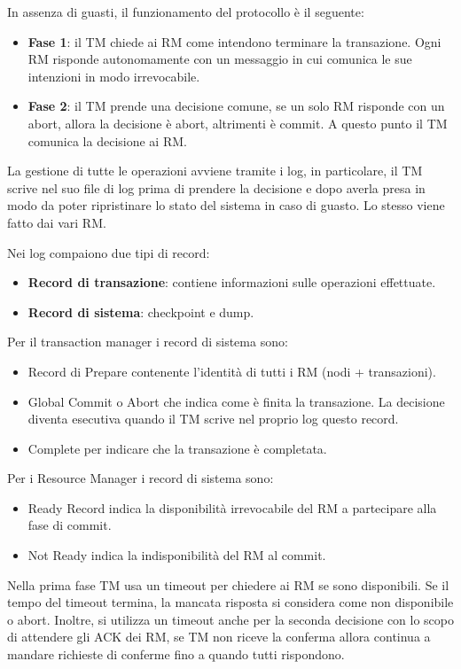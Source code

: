 In assenza di guasti, il funzionamento del protocollo è il seguente:
\begin{itemize}
      \item \textbf{Fase 1}: il TM chiede ai RM come intendono terminare la
            transazione. Ogni RM risponde autonomamente con un messaggio in cui
            comunica le sue intenzioni in modo irrevocabile.
      \item \textbf{Fase 2}: il TM prende una decisione comune, se un solo RM
            risponde con un abort, allora la decisione è abort, altrimenti è
            commit. A questo punto il TM comunica la decisione ai RM.
\end{itemize}
La gestione di tutte le operazioni avviene tramite i log, in particolare, il TM
scrive nel suo file di log prima di prendere la decisione e dopo averla presa
in modo da poter ripristinare lo stato del sistema in caso di guasto. Lo stesso
viene fatto dai vari RM.

Nei log compaiono due tipi di record:
\begin{itemize}
      \item \textbf{Record di transazione}: contiene informazioni sulle operazioni
            effettuate.
      \item \textbf{Record di sistema}: checkpoint e dump.
\end{itemize}

Per il transaction manager i record di sistema sono:
\begin{itemize}
      \item Record di Prepare contenente l'identità di tutti i RM (nodi + transazioni).
      \item Global Commit o Abort che indica come è finita la transazione. La
            decisione diventa esecutiva quando il TM scrive nel proprio log
            questo record.
      \item Complete per indicare che la transazione è completata.
\end{itemize}
Per i Resource Manager i record di sistema sono:
\begin{itemize}
      \item Ready Record indica la disponibilità irrevocabile del RM a partecipare
            alla fase di commit.
      \item Not Ready indica la indisponibilità del RM al commit.
\end{itemize}

Nella prima fase TM usa un timeout per chiedere ai RM se sono disponibili. Se il
tempo del timeout termina, la mancata risposta si considera come non disponibile
o abort. Inoltre, si utilizza un timeout anche per la seconda decisione con lo
scopo di attendere gli ACK dei RM, se TM non riceve la conferma allora continua
a mandare richieste di conferme fino a quando tutti rispondono.


